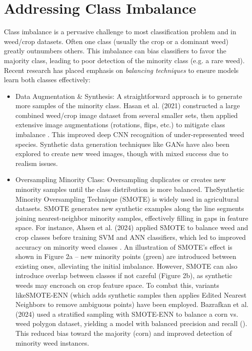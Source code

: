 \documentclass[letterpaper]{report}
\begin{document}
\section{Addressing Class Imbalance}  
Class imbalance is a pervasive challenge to most classification problem and in weed/crop datasets. Often one class (usually the crop or a dominant weed) greatly outnumbers others. This imbalance can bias classifiers to favor the majority class, leading to poor detection of the minority class (e.g. a rare weed). Recent research \parencite{Wang2021-dh} has placed emphasis on \textit{balancing techniques} to ensure models learn both classes effectively:  

\begin{itemize}
	\item{Data Augmentation \& Synthesis: A straightforward approach is to generate more samples of the minority class. Hasan et al. (2021) constructed a large combined weed/crop image dataset from several smaller sets, then applied extensive image augmentations (rotations, flips, etc.) to mitigate class imbalance \parencite{Mahmudul-Hasan2023-ap}. This improved deep CNN recognition of under-represented weed species. Synthetic data generation techniques like GANs have also been explored to create new weed images, though with mixed success due to realism issues. } 

	\item{Oversampling Minority Class: Oversampling duplicates or creates new minority samples until the class distribution is more balanced. TheSynthetic Minority Oversampling Technique (SMOTE) is widely used  in agricultural datasets. SMOTE generates new synthetic examples along the line segments joining nearest-neighbor minority samples, effectively filling in gaps in feature space. For instance, Ahsen et al. (2024) applied SMOTE to balance weed and crop classes before training SVM and ANN classifiers, which led to improved accuracy on minority weed classes \parencite{Ahsen2024-dm}. An illustration of SMOTE’s effect is shown in Figure 2a – new minority points (green) are introduced between existing ones, alleviating the initial imbalance. However, SMOTE can also introduce overlap between classes if not careful (Figure 2b), as synthetic weeds may encroach on crop feature space. To combat this, variants likeSMOTE-ENN (which adds synthetic samples then applies Edited Nearest Neighbors to remove ambiguous points) have been employed. Bazrafkan et al. (2024) used a stratified sampling with SMOTE-ENN to balance a corn vs. weed polygon dataset, yielding a model with balanced precision and recall (\parencite{Bazrafkan2024-bl}). This reduced bias toward the majority (corn) and improved detection of minority weed instances.  }


\end{itemize}
\end{document}
